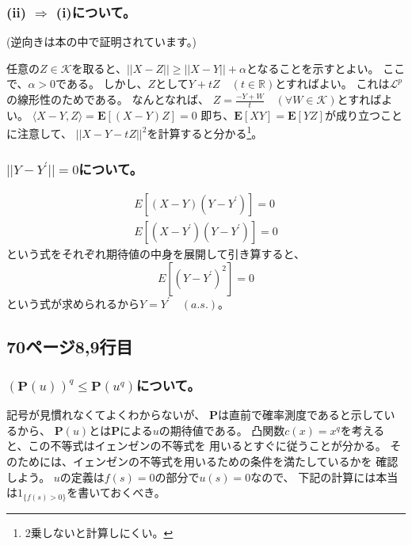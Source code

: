 \documentclass[11pt, a4paper]{jsarticle}
\theoremstyle{definition}
\newcommand{\RR}{{\mathbb{R}}} %
\begin{document}
      \subsubsection{(ii) $\Rightarrow$ (i)について。}
        (逆向きは本の中で証明されています。)

        任意の$Z \in \mathcal{K}$を取ると、$||X - Z|| \ge ||X - Y|| + \alpha$となることを示すとよい。
        ここで、$\alpha > 0$である。
        しかし、$Z$として$Y + tZ \quad (t \in \RR)$とすればよい。
        これは$\mathcal{L}^p$の線形性のためである。
        なんとなれば、
        $Z = \frac{-Y+ W}{t} \quad (\forall W \in \mathcal{K})$とすればよい。
        $\langle X - Y, Z \rangle = \mathbf{E}[(X - Y)Z] = 0$
        即ち、$\mathbf{E}[XY] = \mathbf{E}[YZ]$が成り立つことに注意して、
        $||X - Y - tZ||^2$を計算すると分かる\footnote{2乗しないと計算しにくい。}。

      \subsubsection{$||Y - Y^{\prime}|| = 0$について。}
        \begin{align*}
          E[(X - Y)(Y - Y^{\prime})] = 0\\
          E[(X - Y^{\prime})(Y - Y^{\prime})] = 0
        \end{align*}
        という式をそれぞれ期待値の中身を展開して引き算すると、
        \[
          E[(Y - Y^{\prime})^2] = 0
        \]
        という式が求められるから$Y = Y^{\prime}\quad (a.s.)$。

    \subsection{70ページ8,9行目}
      \subsubsection{$(\mathbf{P}(u))^q \leq \mathbf{P}(u^q)$について。}
        記号が見慣れなくてよくわからないが、
        $\mathbf{P}$は直前で確率測度であると示しているから、
        $\mathbf{P}(u)$とは$\mathbf{P}$による$u$の期待値である。
        凸関数$c(x) = x ^q$を考えると、この不等式はイェンゼンの不等式を
        用いるとすぐに従うことが分かる。
        そのためには、イェンゼンの不等式を用いるための条件を満たしているかを
        確認しよう。
        $u$の定義は$f(s) = 0$の部分で$u(s) = 0$なので、
        下記の計算には本当は$1_{\{f(s) > 0\}}$を書いておくべき。
\end{document}
